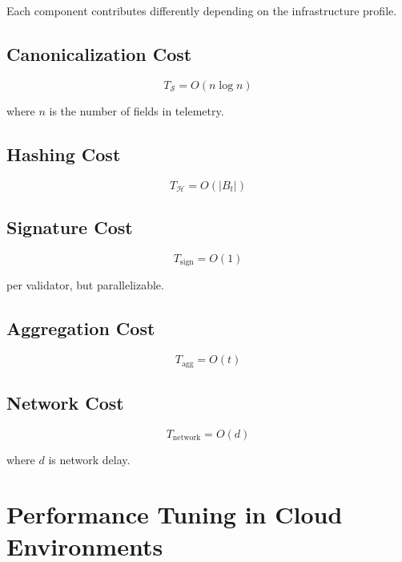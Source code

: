 Each component contributes differently depending on the infrastructure profile.

\subsection{Canonicalization Cost}

\begin{equation}
T_{\mathcal{S}} = O(n \log n)
\end{equation}

where $n$ is the number of fields in telemetry.

\subsection{Hashing Cost}

\begin{equation}
T_{\mathcal{H}} = O(|B_t|)
\end{equation}

\subsection{Signature Cost}

\begin{equation}
T_{\text{sign}} = O(1)
\end{equation}

per validator, but parallelizable.

\subsection{Aggregation Cost}

\begin{equation}
T_{\text{agg}} = O(t)
\end{equation}

\subsection{Network Cost}

\begin{equation}
T_{\text{network}} = O(d)
\end{equation}

where $d$ is network delay.

\section{Performance Tuning in Cloud Environments}

